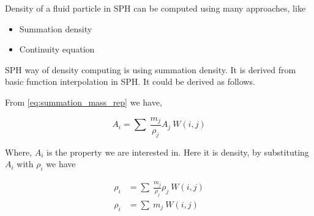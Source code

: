 Density of a fluid particle in SPH can be computed using many approaches, like

\begin{itemize}
\item Summation density
\item Continuity equation
\end{itemize}

SPH way of density computing is using summation density. It is derived from basic
function interpolation in SPH. It could be derived as follows.

From \eqref{eq:summation_mass_rep} we have,

\begin{equation*}
  \label{eq:summation_mass_rep}
  A_i = \sum\> \frac{m_j}{\rho_j} A_j\> W(i,j)
\end{equation*}

Where, $A_i$ is the property we are interested in. Here it is density,
by substituting $A_i$ with $\rho_i$ we have

\begin{align}
  \label{eq:summation_mass_rep}
    \rho_i &= \sum\> \frac{m_j}{\rho_j} \rho_j\> W(i,j) \nonumber \\
    \rho_i &= \sum\> m_j \> W(i,j)
\end{align}






